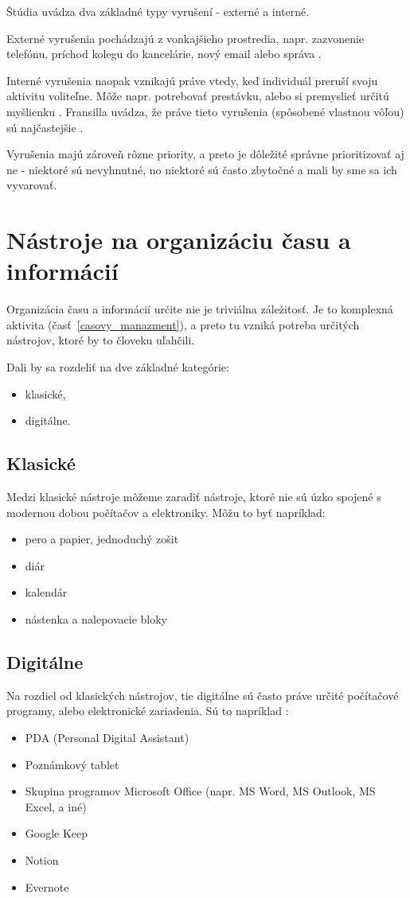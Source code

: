 \documentclass[10pt,slovak,a4paper]{article}
\begin{document}
		Štúdia \cite{NoTask} uvádza dva základné typy vyrušení - externé a interné.
		
		Externé vyrušenia pochádzajú z vonkajšieho prostredia, napr. zazvonenie telefónu, príchod kolegu do kancelárie, nový email alebo správa \cite{NoTask}.
		
		Interné vyrušenia naopak vznikajú práve vtedy, keď individuál preruší svoju aktivitu voliteľne. Môže napr. potrebovať prestávku, alebo si premyslieť určitú myšlienku \cite{NoTask}. Fransilla uvádza, že práve tieto vyrušenia (spôsobené vlastnou vôľou) sú najčastejšie \cite{Franssila}.
		
		Vyrušenia majú zároveň rôzne priority\cite{NoTask}, a preto je dôležité správne prioritizovať aj ne - niektoré sú nevyhnutné, no niektoré sú často zbytočné a mali by sme sa ich vyvarovať.

\section{Nástroje na organizáciu času a informácií}
		Organizácia času a informácií určite nie je triviálna záležitosť. Je to komplexná aktivita (časť~\ref{casovy_manazment}), a preto tu vzniká potreba určitých nástrojov, ktoré by to človeku uľahčili.
		
		Dali by sa rozdeliť na dve základné kategórie:
		\begin{itemize}
			\item klasické,
			\item digitálne.
		\end{itemize}
		
	\subsection{Klasické}
		Medzi klasické nástroje môžeme zaradiť nástroje, ktoré nie sú úzko spojené s modernou dobou počítačov a elektroniky. Môžu to byť napríklad:
		\begin{itemize}
			\item pero a papier, jednoduchý zošit
			\item diár
			\item kalendár
			\item nástenka a nalepovacie bloky
		\end{itemize}
	
	\subsection{Digitálne}
		Na rozdiel od klasických nástrojov, tie digitálne sú často práve určité počítačové programy, alebo elektronické zariadenia. Sú to napríklad :
		\begin{itemize}
			\item PDA (Personal Digital Assistant)
			\item Poznámkový tablet
			\item Skupina programov Microsoft Office (napr. MS Word, MS Outlook, MS Excel, a iné)
			\item Google Keep
			\item Notion
			\item Evernote
		\end{itemize}
		
\end{document}

